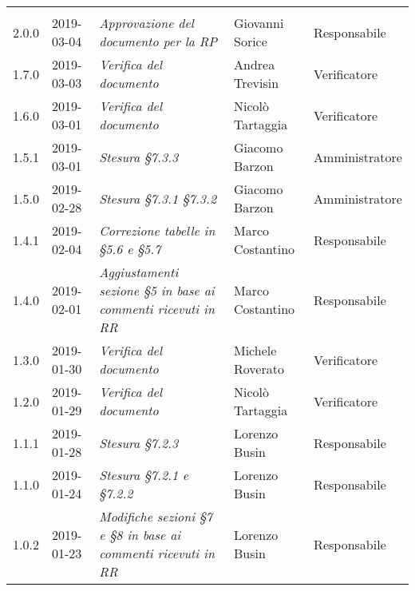 \newpage
\section*{}
	\begin{longtable}{C{2cm}|C{2.5cm}|C{4.5cm}|C{2.5cm}|C{3cm}}

		 &  &  & &\\
		\endhead		

		2.0.0 & 2019-03-04 & \emph{Approvazione del documento per la RP} & Giovanni Sorice & Responsabile \\
		\hline

		1.7.0 & 2019-03-03 & \emph{Verifica del documento} & Andrea Trevisin & Verificatore \\
		\hline

		1.6.0 & 2019-03-01 & \emph{Verifica del documento} & Nicolò Tartaggia & Verificatore \\
		\hline

		1.5.1 & 2019-03-01 & \emph{Stesura §7.3.3} & Giacomo Barzon & Amministratore \\
		\hline

		1.5.0 & 2019-02-28 & \emph{Stesura §7.3.1 §7.3.2} & Giacomo Barzon & Amministratore \\
		\hline

		1.4.1 & 2019-02-04 & \emph{Correzione tabelle in §5.6 e §5.7} & Marco Costantino & Responsabile \\
		\hline

		1.4.0 & 2019-02-01 & \emph{Aggiustamenti sezione §5 in base ai commenti ricevuti in RR} & Marco Costantino & Responsabile \\
		\hline

		1.3.0 & 2019-01-30 & \emph{Verifica del documento} & Michele Roverato & Verificatore \\
		\hline

		1.2.0 & 2019-01-29 & \emph{Verifica del documento} & Nicolò Tartaggia & Verificatore \\
		\hline

		1.1.1 & 2019-01-28 & \emph{Stesura §7.2.3} & Lorenzo Busin & Responsabile \\
		\hline

		1.1.0 & 2019-01-24 & \emph{Stesura §7.2.1 e §7.2.2} & Lorenzo Busin & Responsabile \\
		\hline

		1.0.2 & 2019-01-23 & \emph{Modifiche sezioni §7 e §8 in base ai commenti ricevuti in RR} & Lorenzo Busin & Responsabile \\
		\hline


\end{longtable}
